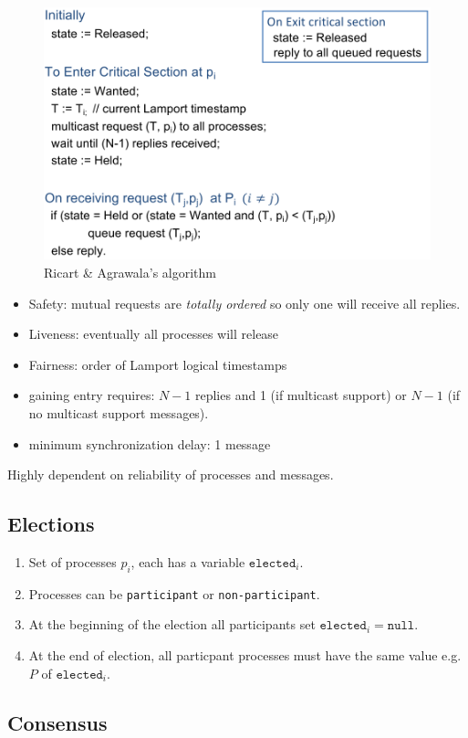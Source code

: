 \documentclass[twocolumn,landscape,10pt]{article}
\theoremstyle{definition}
\begin{document}
\begin{figure}
  	\includegraphics[scale=0.30]{ricart.png}
  	\centering
    \caption{Ricart \& Agrawala's algorithm}\label{fig:ricart}
\end{figure}


\begin{itemize}
    \item Safety: mutual requests are \emph{totally ordered} so only one will
        receive all replies.
    \item Liveness: eventually all processes will release
    \item Fairness: order of Lamport logical timestamps
\end{itemize} 


\begin{itemize}
    \item gaining entry requires: $N-1$ replies and 1 (if multicast support) or
        $N-1$ (if no multicast support messages).
    \item minimum synchronization delay: 1 message
\end{itemize} 


Highly dependent on reliability of processes and messages.


\subsection{Elections}

\begin{enumerate}
    \item Set of processes $p_i$, each has a variable $\texttt{elected}_i$.
    \item Processes can be \texttt{participant} or \texttt{non-participant}.
    \item At the beginning of the election all participants set
        $\texttt{elected}_i=\texttt{null}$.
    \item At the end of election, all particpant processes must have the same
        value e.g. $P$ of $\texttt{elected}_i$.
\end{enumerate} 


\subsection{Consensus}
\end{document}
